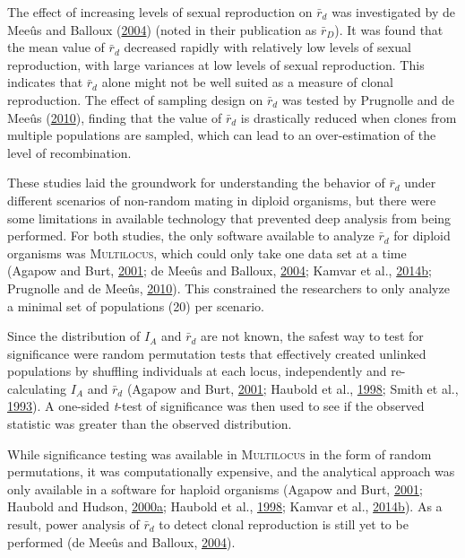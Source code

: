 \documentclass[double,12pt]{beavtex}
\begin{document}
  The effect of increasing levels of sexual reproduction on \(\bar{r}_d\)
  was investigated by de Meeûs and Balloux
  (\protect\hyperlink{ref-de2004clonal}{2004}) (noted in their publication
  as \(\bar{r}_D\)). It was found that the mean value of \(\bar{r}_d\)
  decreased rapidly with relatively low levels of sexual reproduction,
  with large variances at low levels of sexual reproduction. This
  indicates that \(\bar{r}_d\) alone might not be well suited as a measure
  of clonal reproduction. The effect of sampling design on \(\bar{r}_d\)
  was tested by Prugnolle and de Meeûs
  (\protect\hyperlink{ref-prugnolle2010apparent}{2010}), finding that the
  value of \(\bar{r}_d\) is drastically reduced when clones from multiple
  populations are sampled, which can lead to an over-estimation of the
  level of recombination.
  
  These studies laid the groundwork for understanding the behavior of
  \(\bar{r}_d\) under different scenarios of non-random mating in diploid
  organisms, but there were some limitations in available technology that
  prevented deep analysis from being performed. For both studies, the only
  software available to analyze \(\bar{r}_d\) for diploid organisms was
  \textsc{Multilocus}, which could only take one data set at a time
  (Agapow and Burt, \protect\hyperlink{ref-Agapow_2001}{2001}; de Meeûs
  and Balloux, \protect\hyperlink{ref-de2004clonal}{2004}; Kamvar et al.,
  \protect\hyperlink{ref-kamvar2014poppr}{2014}\protect\hyperlink{ref-kamvar2014poppr}{b};
  Prugnolle and de Meeûs,
  \protect\hyperlink{ref-prugnolle2010apparent}{2010}). This constrained
  the researchers to only analyze a minimal set of populations (20) per
  scenario.
  
  Since the distribution of \(I_A\) and \(\bar{r}_d\) are not known, the
  safest way to test for significance were random permutation tests that
  effectively created unlinked populations by shuffling individuals at
  each locus, independently and re-calculating \(I_A\) and \(\bar{r}_d\)
  (Agapow and Burt, \protect\hyperlink{ref-Agapow_2001}{2001}; Haubold et
  al., \protect\hyperlink{ref-haubold1998detecting}{1998}; Smith et al.,
  \protect\hyperlink{ref-smith1993how}{1993}). A one-sided \emph{t}-test
  of significance was then used to see if the observed statistic was
  greater than the observed distribution.
  
  While significance testing was available in \textsc{Multilocus} in the
  form of random permutations, it was computationally expensive, and the
  analytical approach was only available in a software for haploid
  organisms (Agapow and Burt, \protect\hyperlink{ref-Agapow_2001}{2001};
  Haubold and Hudson,
  \protect\hyperlink{ref-haubold2000lian}{2000}\protect\hyperlink{ref-haubold2000lian}{a};
  Haubold et al., \protect\hyperlink{ref-haubold1998detecting}{1998};
  Kamvar et al.,
  \protect\hyperlink{ref-kamvar2014poppr}{2014}\protect\hyperlink{ref-kamvar2014poppr}{b}).
  As a result, power analysis of \(\bar{r}_d\) to detect clonal
  reproduction is still yet to be performed (de Meeûs and Balloux,
  \protect\hyperlink{ref-de2004clonal}{2004}).
  
\end{document}
